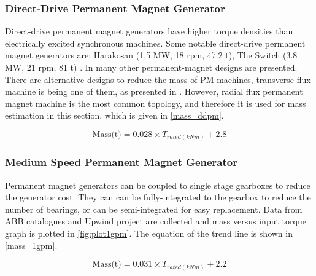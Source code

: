 \documentclass{article}\usepackage{graphicx, color}
\begin{document}
\subsubsection{Direct-Drive Permanent Magnet Generator}

Direct-drive permanent magnet generators have higher torque densities than electrically excited synchronous machines. Some notable direct-drive permanent magnet generators are: Harakosan (1.5 MW, 18 rpm, 47.2 t), The Switch (3.8 MW, 21 rpm, 81 t) \cite{Duan2009}. In \cite{Bang2008,upwind2011} many other permanent-magnet designs are presented. There are alternative designs to reduce the mass of PM machines, transverse-flux machine is being one of them, as presented in \cite{Bang2009}. However, radial flux permanent magnet machine is the most common topology, and therefore it is used for mass estimation in this section, which is given in \autoref{mass_ddpm}.

\begin{equation}
  \text{Mass(t)} = 0.028 \times {T_{rated(kNm)}} + 2.8
  \label{mass_ddpm}
\end{equation}

\subsubsection{Medium Speed Permanent Magnet Generator}

Permanent magnet generators can be coupled to single stage gearboxes to reduce the generator cost. They can can be fully-integrated to the gearbox to reduce the number of bearings, or can be semi-integrated for easy replacement. Data from ABB catalogues \cite{ABB2012} and Upwind project are collected and mass versus input torque graph is plotted in \autoref{fig:plot1gpm}. The equation of the trend line is shown in \autoref{mass_1gpm}. 

\begin{equation}
  \text{Mass(t)} = 0.031 \times {T_{rated(kNm)}} + 2.2
  \label{mass_1gpm}
\end{equation}
\end{document}
